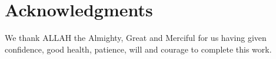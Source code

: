 \chapter*{Acknowledgments}





We thank ALLAH the Almighty, Great and Merciful for us having given confidence, good health, patience, will and courage to complete this work.

